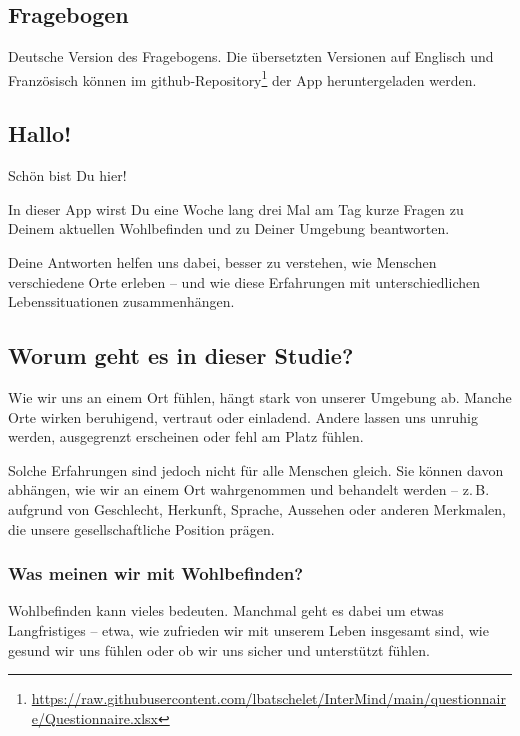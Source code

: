 \appendix
{}

\begin{appendices}


\section{Fragebogen}
\label{app:appendix_fragebogen}

Deutsche Version des Fragebogens. Die übersetzten Versionen auf Englisch und Französisch können im \gls{github}-Repository\footnote{\href{https://raw.githubusercontent.com/lbatschelet/InterMind/main/questionnaire/Questionnaire.xlsx}{https://raw.githubusercontent.com/lbatschelet/InterMind/main/questionnaire/Questionnaire.xlsx}} der App heruntergeladen werden.


\subsection*{Hallo!}
Schön bist Du hier!

In dieser App wirst Du eine Woche lang drei Mal am Tag kurze Fragen zu Deinem aktuellen Wohlbefinden und zu Deiner Umgebung beantworten.

Deine Antworten helfen uns dabei, besser zu verstehen, wie Menschen verschiedene Orte erleben – und wie diese Erfahrungen mit unterschiedlichen Lebenssituationen zusammenhängen.

\hrulefill

\subsection*{Worum geht es in dieser Studie?}
Wie wir uns an einem Ort fühlen, hängt stark von unserer Umgebung ab. Manche Orte wirken beruhigend, vertraut oder einladend. Andere lassen uns unruhig werden, ausgegrenzt erscheinen oder fehl am Platz fühlen.

Solche Erfahrungen sind jedoch nicht für alle Menschen gleich. Sie können davon abhängen, wie wir an einem Ort wahrgenommen und behandelt werden – z.\,B. aufgrund von Geschlecht, Herkunft, Sprache, Aussehen oder anderen Merkmalen, die unsere gesellschaftliche Position prägen.

\subsubsection*{Was meinen wir mit Wohlbefinden?}
Wohlbefinden kann vieles bedeuten. Manchmal geht es dabei um etwas Langfristiges – etwa, wie zufrieden wir mit unserem Leben insgesamt sind, wie gesund wir uns fühlen oder ob wir uns sicher und unterstützt fühlen.


\end{appendices}
